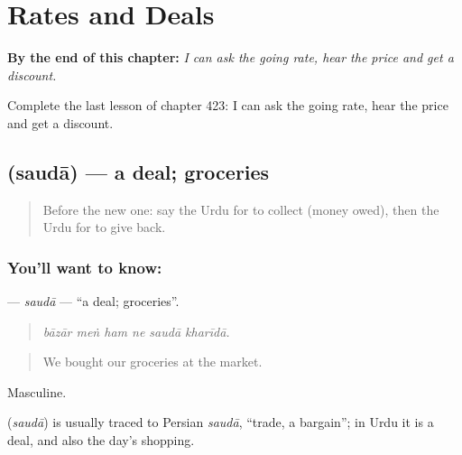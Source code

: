 
\chapter{Rates and Deals}
\label{ch:ur-rates-and-deals}

\begin{chapteropening}
\textbf{By the end of this chapter:} \emph{I can ask the going rate, hear the price and get a discount.}

Complete the last lesson of chapter 423: I can ask the going rate, hear the price and get a discount.
\end{chapteropening}

\section[\texorpdfstring{\ur{سودا} (saudā)}{سودا (saudā)}]{ (saudā) — a deal; groceries}

\label{lesson:UR-C423-sauda}



\begin{quote}
Before the new one: say the Urdu for to collect (money owed), then the Urdu for to give back.
\end{quote}

\subsection*{You'll want to know: }
\textbf{} — \emph{saudā} — \textquotedblleft{}a deal; groceries\textquotedblright{}.

\begin{quote}
     
\end{quote}

\begin{quote}
\emph{bāzār meṅ ham ne saudā kharīdā.}
\end{quote}

\begin{quote}
We bought our groceries at the market.
\end{quote}

Masculine.

\begin{cousinweb}
\textbf{} (\emph{saudā}) is usually traced to Persian \emph{saudā}, \textquotedblleft{}trade, a bargain\textquotedblright{}; in Urdu it is a deal, and also the day's shopping.
\end{cousinweb}


